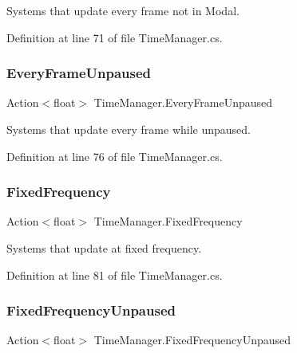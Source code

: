 Systems that update every frame not in Modal. 



Definition at line 71 of file Time\+Manager.\+cs.

\mbox{\label{class_time_manager_ab7ecb89b1c903096f6b95b031e8b4b98}} 
\subsubsection{\texorpdfstring{Every\+Frame\+Unpaused}{EveryFrameUnpaused}}
{\footnotesize\ttfamily Action$<$float$>$ Time\+Manager.\+Every\+Frame\+Unpaused}



Systems that update every frame while unpaused. 



Definition at line 76 of file Time\+Manager.\+cs.

\mbox{\label{class_time_manager_aeebfc9883aff231dfd13abc52f1510c6}} 
\subsubsection{\texorpdfstring{Fixed\+Frequency}{FixedFrequency}}
{\footnotesize\ttfamily Action$<$float$>$ Time\+Manager.\+Fixed\+Frequency}



Systems that update at fixed frequency. 



Definition at line 81 of file Time\+Manager.\+cs.

\mbox{\label{class_time_manager_a6409743a5b7413daae38d535063dc29d}} 
\subsubsection{\texorpdfstring{Fixed\+Frequency\+Unpaused}{FixedFrequencyUnpaused}}
{\footnotesize\ttfamily Action$<$float$>$ Time\+Manager.\+Fixed\+Frequency\+Unpaused}



